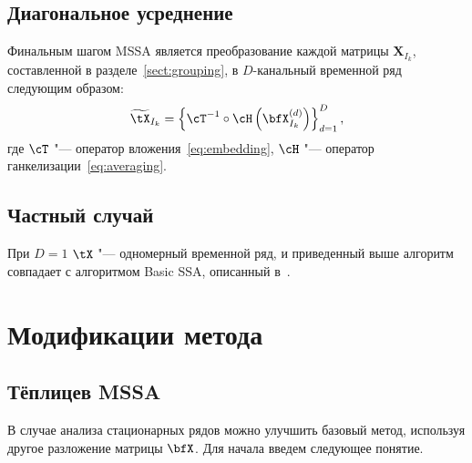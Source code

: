 \documentclass[specialist,
substylefile = spbu_report.rtx,
subf,href,colorlinks=true, 12pt]{disser}
\newcommand{\traj}{\mathbf{X}}
\theoremstyle{definition}
\begin{document}
	\subsection{Диагональное усреднение}\label{sect:averaging}
	Финальным шагом MSSA является преобразование каждой матрицы $\traj_{I_k}$, составленной в разделе~\ref{sect:grouping}, в $D$-канальный временной ряд следующим образом:
	\begin{equation}
		\widetilde\tX_{I_k}=\left\{\cT^{-1}\circ\cH\left(\bfX_{I_k}^{(d)}\right)\right\}_{d=1}^D,
	\end{equation}
	где $\cT$ "--- оператор вложения~\eqref{eq:embedding}, $\cH$ "--- оператор ганкелизации~\eqref{eq:averaging}.
	
	
	\subsection{Частный случай}
	При $D=1$ $\tX$ "--- одномерный временной ряд, и приведенный выше алгоритм совпадает с алгоритмом Basic SSA, описанный в~\cite{ssa_an}.
	
	\section{Модификации метода}
	\subsection{Тёплицев MSSA}\label{toeplitz}
	В случае анализа стационарных рядов можно улучшить базовый метод, используя другое разложение матрицы $\bfX$. Для начала введем следующее понятие.
	
\end{document}
